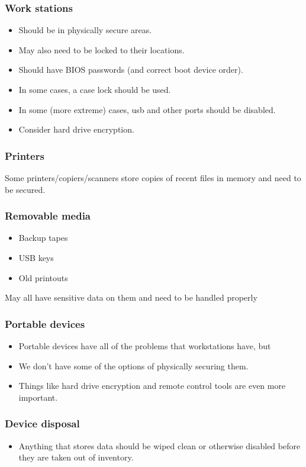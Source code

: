 \documentclass[10pt]{beamer}
\begin{document}
\begin{frame}
  \frametitle{Work stations}


 \begin{itemize}
  \item Should be in physically secure areas.
  \item May also need to be locked to their locations.
  \item Should have BIOS passwords (and correct boot device order).
  \item In some cases, a case lock should be used.
  \item In some (more extreme) cases, usb and other ports should be disabled.
  \item Consider hard drive encryption.
 \end{itemize}
\end{frame}


\begin{frame}
  \frametitle{Printers}

Some printers/copiers/scanners store copies of recent files in memory and
need to be secured.

\end{frame}


\begin{frame}
  \frametitle{Removable media}


 \begin{itemize}
  \item Backup tapes
  \item USB keys
  \item Old printouts
 \end{itemize}
 
 May all have sensitive data on them and need to be handled properly
\end{frame}


\begin{frame}
  \frametitle{Portable devices}


 \begin{itemize}
  \item Portable devices have all of the problems that workstations have, but
  \item We don't have some of the options of physically securing them.
  \item Things like hard drive encryption and remote control tools are even more important.
 \end{itemize}
\end{frame}
\begin{frame}
  \frametitle{Device disposal}


 \begin{itemize}
  \item Anything that stores data should be wiped clean or otherwise disabled before
	  they are taken out of inventory.
 \end{itemize}
\end{frame}
\end{document}
